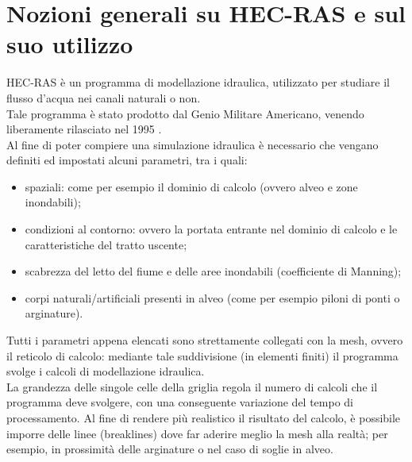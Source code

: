 \section{Nozioni generali su HEC-RAS e sul suo utilizzo}
HEC-RAS è un programma di modellazione idraulica, utilizzato per studiare il flusso d'acqua nei canali naturali o non.\\
Tale programma è stato prodotto dal Genio Militare Americano, venendo liberamente rilasciato nel 1995 \cite{hec-ras}.\\
Al fine di poter compiere una simulazione idraulica è necessario che vengano definiti ed impostati alcuni parametri, tra i quali:
\begin{itemize}
    \item spaziali: come per esempio il dominio di calcolo (ovvero alveo e zone inondabili);
    \item condizioni al contorno: ovvero la portata entrante nel dominio di calcolo e le caratteristiche del tratto uscente;
    \item scabrezza del letto del fiume e delle aree inondabili (coefficiente di Manning);
    \item corpi naturali/artificiali presenti in alveo (come per esempio piloni di ponti o arginature).
\end{itemize}
Tutti i parametri appena elencati sono strettamente collegati con la mesh, ovvero il reticolo di calcolo: mediante tale suddivisione (in elementi finiti) il programma svolge i calcoli di modellazione idraulica.\\
La grandezza delle singole celle della griglia regola il numero di calcoli che il programma deve svolgere, con una conseguente variazione del tempo di processamento. Al fine di rendere più realistico il risultato del calcolo, è possibile imporre delle linee (breaklines) dove far aderire meglio la mesh alla realtà; per esempio, in prossimità delle arginature o nel caso di soglie in alveo.